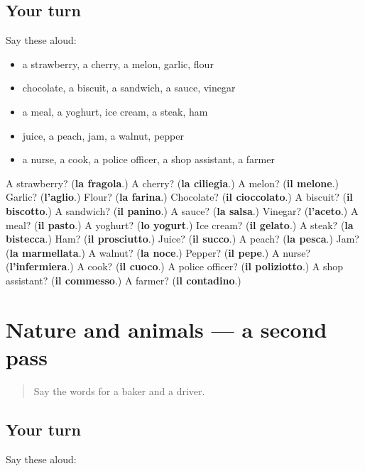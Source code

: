 \subsection*{Your turn}
Say these aloud:

\begin{itemize}
\raggedright
  \item a strawberry, a cherry, a melon, garlic, flour
  \item chocolate, a biscuit, a sandwich, a sauce, vinegar
  \item a meal, a yoghurt, ice cream, a steak, ham
  \item juice, a peach, jam, a walnut, pepper
  \item a nurse, a cook, a police officer, a shop assistant, a farmer
\end{itemize}

\begin{tcolorbox}[breakable,colback=teal!4,colframe=teal!35!black,title={Before you move on}]
A strawberry? (\textbf{la fragola}.) A cherry? (\textbf{la ciliegia}.) A melon? (\textbf{il melone}.) Garlic? (\textbf{l'aglio}.) Flour? (\textbf{la farina}.) Chocolate? (\textbf{il cioccolato}.) A biscuit? (\textbf{il biscotto}.) A sandwich? (\textbf{il panino}.) A sauce? (\textbf{la salsa}.) Vinegar? (\textbf{l'aceto}.) A meal? (\textbf{il pasto}.) A yoghurt? (\textbf{lo yogurt}.) Ice cream? (\textbf{il gelato}.) A steak? (\textbf{la bistecca}.) Ham? (\textbf{il prosciutto}.) Juice? (\textbf{il succo}.) A peach? (\textbf{la pesca}.) Jam? (\textbf{la marmellata}.) A walnut? (\textbf{la noce}.) Pepper? (\textbf{il pepe}.) A nurse? (\textbf{l'infermiera}.) A cook? (\textbf{il cuoco}.) A police officer? (\textbf{il poliziotto}.) A shop assistant? (\textbf{il commesso}.) A farmer? (\textbf{il contadino}.)
\end{tcolorbox}
\section[(dialogue)]{Nature and animals — a second pass}

\label{lesson:IT-R116-second-pass-nature-and-animals}



\begin{quote}
Say the words for a baker and a driver.
\end{quote}

\subsection*{Your turn}
Say these aloud:

